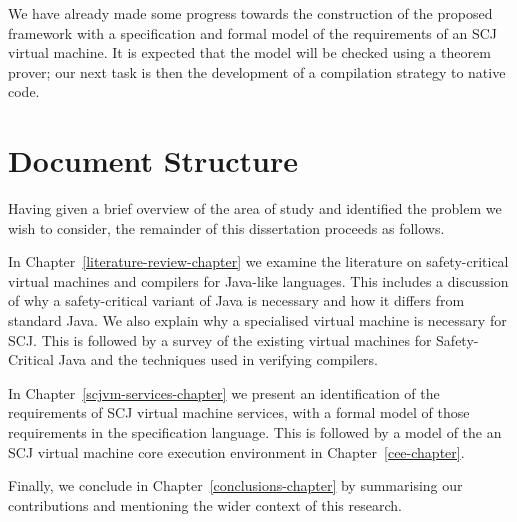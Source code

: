 \documentclass[a4paper,10pt]{report}
\begin{document}
We have already made some progress towards the construction of the
proposed framework with a specification and formal model of the
requirements of an SCJ virtual machine.
It is expected that the model will be checked using a theorem prover;
our next task is then the development of a compilation strategy to
native code.

\section{Document Structure}

Having given a brief overview of the area of study and identified the
problem we wish to consider, the remainder of this dissertation
proceeds as follows.

In Chapter~\ref{literature-review-chapter} we examine the literature
on safety-critical virtual machines and compilers for Java-like
languages.
This includes a discussion of why a safety-critical variant of Java is
necessary and how it differs from standard Java.
We also explain why a specialised virtual machine is necessary for
SCJ.
This is followed by a survey of the existing virtual machines for
Safety-Critical Java and the techniques used in verifying compilers.

In Chapter~\ref{scjvm-services-chapter} we present an identification of the
requirements of SCJ virtual machine services, with a formal model of
those requirements in the \Circus{} specification language.
This is followed by a model of the an SCJ virtual machine core
execution environment in Chapter~\ref{cee-chapter}.

Finally, we conclude in Chapter~\ref{conclusions-chapter} by
summarising our contributions and mentioning the wider context of this
research.

\end{document}
